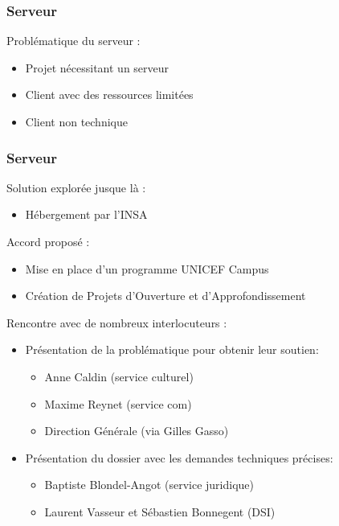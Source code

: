 

\speaker{\Matthieu}

\begin{frame}
	\frametitle{Serveur}
    Problématique du serveur :
      \begin{itemize}
        \item Projet nécessitant un serveur
        \item Client avec des ressources limitées
        \item Client non technique
      \end{itemize}
\end{frame}

\begin{frame}
	\frametitle{Serveur}
	Solution explorée jusque là :
	\begin{itemize}	
    \item Hébergement par l'INSA
    \end{itemize}
    
	Accord proposé :
	\begin{itemize}
		\item Mise en place d'un programme UNICEF Campus
		\item Création de Projets d’Ouverture et d’Approfondissement %
	\end{itemize}
\end{frame}

\begin{frame}
	 Rencontre avec de nombreux interlocuteurs :
	\begin{itemize}
    	\item Présentation de la problématique pour obtenir leur soutien:
		\begin{itemize}
			\item Anne Caldin (service culturel)
			\item Maxime Reynet (service com)
			\item Direction Générale (via Gilles Gasso)
		\end{itemize}
		\item Présentation du dossier avec les demandes techniques précises:
		\begin{itemize}
			\item Baptiste Blondel-Angot (service juridique)
			\item Laurent Vasseur et Sébastien Bonnegent (DSI)
		\end{itemize}    
	\end{itemize}    
\end{frame}

